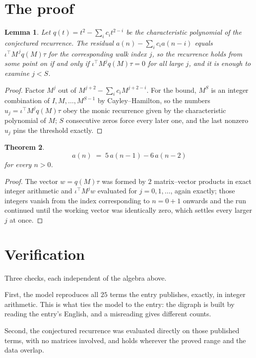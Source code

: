 \documentclass[11pt,a4paper]{article}
\theoremstyle{plain}
\newtheorem{theorem}{Theorem}
\newtheorem{lemma}[theorem]{Lemma}
\theoremstyle{definition}
\begin{document}
\section{The proof}

\begin{lemma}\label{lem:crit}
Let $q(t)=t^{2}-\sum_i c_it^{2-i}$ be the characteristic polynomial of the
conjectured recurrence. The residual $a(n)-\sum_ic_ia(n-i)$ equals
$\iota^{\!\top}M^{\,j}q(M)\tau$ for the corresponding walk index $j$, so the recurrence
holds from some point on if and only if $\iota^{\!\top}M^{j}q(M)\tau=0$ for all large $j$,
and it is enough to examine $j<S$.
\end{lemma}

\begin{proof}
Factor $M^{j}$ out of $M^{j+2}-\sum_ic_iM^{j+2-i}$. For the bound, $M^{S}$
is an integer combination of $I,M,\dots,M^{S-1}$ by Cayley--Hamilton, so the numbers
$u_j=\iota^{\!\top}M^{j}q(M)\tau$ obey the monic recurrence given by the characteristic
polynomial of $M$; $S$ consecutive zeros force every later one, and the last nonzero $u_j$
pins the threshold exactly.
\end{proof}

\begin{theorem}
\[
a(n)\;=\;5\,a(n-1) - 6\,a(n-2)
\]
for every $n>0$.
\end{theorem}

\begin{proof}
The vector $w=q(M)\tau$ was formed by $2$ matrix--vector products in exact integer
arithmetic and $\iota^{\!\top}M^{j}w$ evaluated for $j=0,1,\dots$, again exactly; those
integers vanish from the index corresponding to $n=0+1$ onwards and the run continued
until the working vector was identically zero, which settles every larger $j$ at once.
\end{proof}

\section{Verification}

Three checks, each independent of the algebra above.

First, the model reproduces all $25$ terms the entry publishes, exactly, in integer
arithmetic. This is what ties the model to the entry: the digraph is built by reading the
entry's English, and a misreading gives different counts.

Second, the conjectured recurrence was evaluated directly on those published terms, with no
matrices involved, and holds wherever the proved range and the data overlap.
\end{document}
